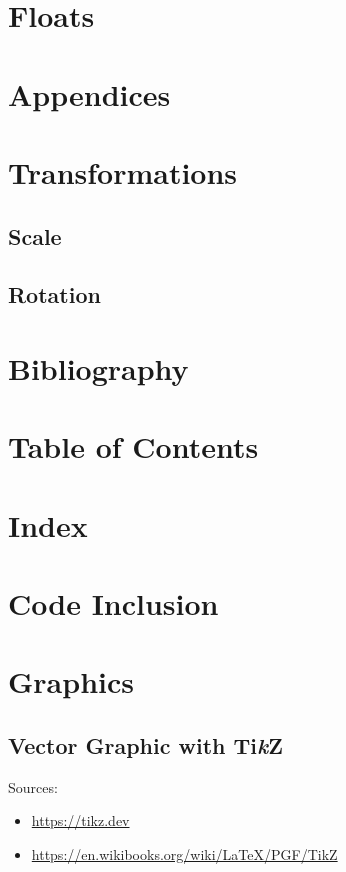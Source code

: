 \section{Floats}

\section{Appendices}

\section{Transformations}
\subsection{Scale}
\subsection{Rotation}

\section{Bibliography}
\section{Table of Contents}
\section{Index}

\section{Code Inclusion}

\section{Graphics}
\subsection{Vector Graphic with Ti\textit{k}Z}

Sources:
\begin{itemize}
  \item \url{https://tikz.dev}
  \item \url{https://en.wikibooks.org/wiki/LaTeX/PGF/TikZ}
\end{itemize}

